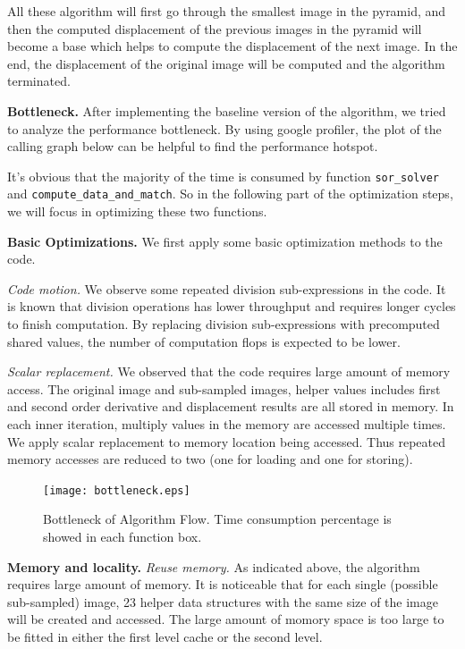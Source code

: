 \documentclass[letterpaper]{article}
\newcommand{\mypar}[1]{{\bf #1.}}
\begin{document}
All these algorithm will first go through the smallest image in the 
pyramid, and then the computed displacement of the previous images 
in the pyramid will become a base which helps to compute the displacement 
of the next image. In the end, the displacement of the original image 
will be computed and the algorithm terminated. 

\mypar{Bottleneck}
After implementing the baseline version of the algorithm, we tried to 
analyze the performance bottleneck. By using google profiler, the plot 
of the calling graph below can be helpful to find the performance 
hotspot. 

It's obvious that the majority of the time is consumed by function 
\texttt{sor\_solver} and \texttt{compute\_data\_and\_match}. So in the 
following part of the optimization steps, we will focus in optimizing 
these two functions. 



\mypar{Basic Optimizations}
We first apply some basic optimization methods to the code. 

\emph{Code motion.} We observe some repeated division sub-expressions 
in the code. It is known that division operations has lower throughput 
and requires longer cycles to finish computation. By replacing division
sub-expressions with precomputed shared values, the number of computation 
flops is expected to be lower. 

\emph{Scalar replacement. } We observed that the code requires large 
amount of memory access. The original image and sub-sampled images,  
helper values includes first and second order derivative and displacement 
results are all stored in memory. In each inner iteration, multiply 
values in the memory are accessed multiple times. We apply scalar 
replacement to memory location being accessed. Thus repeated memory 
accesses are reduced to two (one for loading and one for storing). 

\begin{figure}[H]\centering
  \texttt{[image: bottleneck.eps]}
  \caption{Bottleneck of Algorithm Flow. Time consumption percentage 
  is showed in each function box. }
\end{figure}
\mypar{Memory and locality}
\emph{Reuse memory. } As indicated above, the algorithm requires large 
amount of memory. It is noticeable that for each single (possible sub-sampled) 
image, 23 helper data structures with the same size of the image will be 
created and accessed. The large amount of momory space is too large 
to be fitted in either the first level cache or the second level. 
\end{document}
